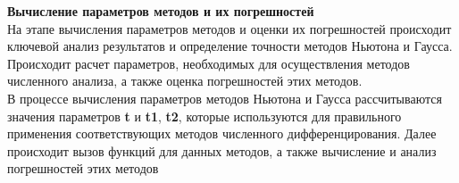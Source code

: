 \documentclass{article}
\begin{document}
\textbf{\large{Вычисление параметров методов и их погрешностей}} \\ 
На этапе вычисления параметров методов и оценки их погрешностей происходит ключевой анализ результатов и определение точности методов Ньютона и Гаусса. Происходит расчет параметров, необходимых для осуществления методов численного анализа, а также оценка погрешностей этих методов. \\
В процессе вычисления параметров методов Ньютона и Гаусса рассчитываются значения параметров \textbf{t} и \textbf{t1}, \textbf{t2}, которые используются для правильного применения соответствующих методов численного дифференцирования. Далее происходит вызов функций для данных методов, а также вычисление и анализ погрешностей этих методов \\ \\ \\ \\ \\ \\ \\ \\ 
\end{document}
